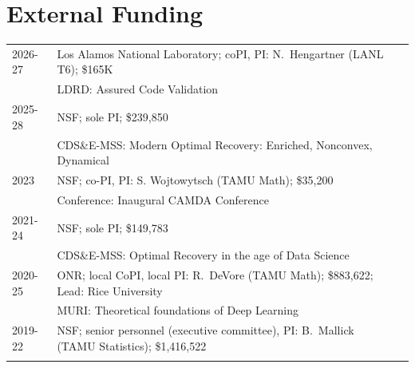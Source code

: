 \documentclass[11pt]{article}
\begin{document}
\section{External Funding}


\begin{tabular}{lll}
2026-27 & Los Alamos National Laboratory; coPI, PI: N.~Hengartner (LANL T6); \$165K\\
& \hspace{-15mm}
{\small LDRD:}
Assured Code Validation\\
2025-28 & NSF; sole PI; \$239,850\\
& \hspace{-15mm}
{\small CDS\&E-MSS:} Modern Optimal Recovery: Enriched, Nonconvex, Dynamical\\
2023 & NSF; co-PI,  PI: S. Wojtowytsch (TAMU Math); \$35,200\\
& \hspace{-15mm}
{\small Conference:} Inaugural CAMDA Conference\\
2021-24 & NSF; sole PI; \$149,783\\
& \hspace{-15mm}
{\small CDS\&E-MSS:} Optimal Recovery in the age of Data Science\\
2020-25 & ONR; local CoPI, local PI: R.~DeVore (TAMU Math); \$883,622;
Lead: Rice University\\
& \hspace{-15mm}
{\small MURI:} Theoretical foundations of Deep Learning \\
2019-22 & NSF; senior personnel (executive committee), PI: B.~Mallick (TAMU  Statistics);  \$1,416,522 \\
& \hspace{-15mm}

\end{tabular}
\end{document}

